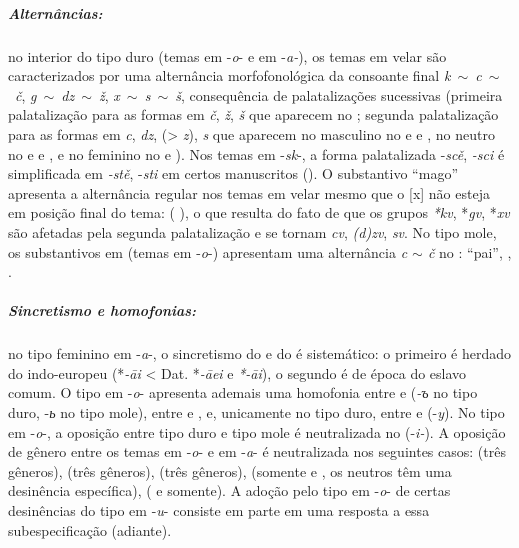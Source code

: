 \subparagraph{Alternâncias:} no interior do tipo duro (temas em -\emph{o}- e em
-\emph{a-}), os temas em velar são caracterizados por uma alternância
morfofonológica da consoante final \mbox{\emph{k} $\sim$ \emph{c}
$\sim$ \emph{č}}, \mbox{\emph{g} $\sim$ \emph{dz} $\sim$ \emph{ž}},
\mbox{\emph{x} $\sim$ \emph{s} $\sim$ \emph{š}}, consequência de
palatalizações sucessivas (primeira palatalização para as formas em
\emph{č}, \emph{ž}, \emph{š} que aparecem no ; segunda
palatalização para as formas em \emph{c}, \emph{dz}, (>
\emph{z}), \emph{s} que aparecem no masculino no  e  e
,
no neutro no  e  e , e no
feminino no 
e ). Nos temas em -\emph{sk}-, a forma palatalizada
-\emph{scě}, \emph{-sci} é simplificada em \emph{-stě}, -\emph{sti} em
certos manuscritos (). O substantivo 
``mago'' apresenta a alternância regular nos temas em velar mesmo que o
[x] não esteja em posição final do tema:  
( ), o que resulta do fato de que os
grupos \emph{*kv}, *\emph{gv}, *\emph{xv} são afetadas pela segunda
palatalização e se tornam \emph{cv}, \emph{(d)zv}, \emph{sv}.
No tipo
mole, os substantivos em  (temas em -\emph{o}-)
apresentam uma alternância \emph{c $\sim$ č} no :
  ``pai'',  ,
 .

\subparagraph{Sincretismo e homofonias:} no tipo feminino em -\emph{a}-, o
sincretismo do  e do  é sistemático: o primeiro é
herdado do indo-europeu (*\emph{-āi} < Dat. *\emph{-āei} e
 \emph{*-āi}), o segundo é de época do eslavo comum. O tipo em
-\emph{o}-  apresenta ademais uma homofonia entre  e
 (\emph{-ъ} no tipo duro, -\emph{ь} no tipo mole), entre  e
, e, unicamente no tipo duro, entre  e
(-\emph{y}). No tipo em -\emph{o}-, a oposição entre tipo duro e tipo
mole é neutralizada no  (-\emph{i-}). A oposição de gênero
entre os temas em -\emph{o}- e em -\emph{a}- é neutralizada nos
seguintes casos:  (três gêneros),  (três gêneros),
 (três gêneros),  (somente  e
, os neutros têm uma desinência específica), 
( e  somente). A adoção pelo tipo em -\emph{o}- de certas
desinências do tipo em -\emph{u}- consiste em parte em uma resposta a essa
subespecificação (adiante).
\clearpage

